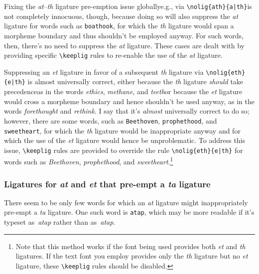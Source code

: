 \documentclass[11pt]{article}
\newcommand{\opt}[1]{\texttt{#1}}
\newcommand{\cmmd}[1]{\texttt{\textbackslash #1}}
\begin{document}
Fixing the \emph{at}--\emph{th} ligature pre-emption issue globally\textemdash e.g., via \Verb+\nolig{ath}{a|th}+\textemdash is not completely innocuous, though, because doing so will also suppress the \emph{at} ligature for words such as \opt{boathook}, for which the \emph{th} ligature would span a morpheme boundary and thus shouldn't be employed anyway. For such words, then, there's no need to suppress the \emph{at} ligature. These cases are dealt with by providing specific \cmmd{keeplig} rules to re-enable the use of the \emph{at} ligature.

Suppressing an \emph{et} ligature in favor of a subsequent \emph{th} ligature via \Verb+\nolig{eth}{e|th}+ is almost universally correct, either because the \emph{th} ligature \emph{should} take precedence\textemdash as in the words \emph{ethics}, \emph{methane}, and \emph{teeth}\textemdash or because the \emph{et} ligature would cross a morpheme boundary and hence shouldn't be used anyway, as in the words \emph{forethought} and \emph{rethink}. 
I say that it's \emph{almost} universally correct to do so; however, there are some words, such as \opt{Beethoven}, \opt{prophethood}, and \opt{sweetheart}, for which the \emph{th} ligature would be inappropriate anyway and for which the use of the \emph{et} ligature would hence be unproblematic. To address this issue, \cmmd{keeplig} rules are provided to override the rule \Verb+\nolig{eth}{e|th}+ for words such as \emph{Beethoven}, \emph{prophethood}, and \emph{sweetheart}.\footnote{Note that this method works if the font being used provides both \emph{et} and \emph{th} ligatures. If the text font you employ provides only the \emph{th} ligature but no \emph{et} ligature, these \cmmd{keeplig} rules should be disabled.}



\subsubsection*{Ligatures for \emph{at} and \emph{et} that pre-empt a \emph{ta} ligature}

There seem to be only few words for which an \emph{at} ligature might inappropriately pre-empt a \emph{ta} ligature. One such word is \opt{atap}, which may be more readable if it's typeset as~\emph{atap} rather than as~\emph{\mbox{at}ap}.
\end{document}
